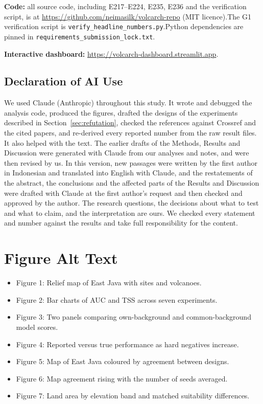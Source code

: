 \documentclass[12pt]{article}
\begin{document}
\textbf{Code:} all source code, including E217--E224, E235, E236 and the verification script, is at \url{https://github.com/neimasilk/volcarch-repo} (MIT licence).\newline The G1 verification script is \texttt{verify\_headline\_numbers.py}.\newline Python dependencies are pinned in \texttt{requirements\_submission\_lock.txt}.

\textbf{Interactive dashboard:} \url{https://volcarch-dashboard.streamlit.app}.

\subsection*{Declaration of AI Use}

We used Claude (Anthropic) throughout this study.
It wrote and debugged the analysis code, produced the figures, drafted the designs of the experiments described in Section~\ref{sec:refutation}, checked the references against Crossref and the cited papers, and re-derived every reported number from the raw result files.
It also helped with the text.
The earlier drafts of the Methods, Results and Discussion were generated with Claude from our analyses and notes, and were then revised by us.
In this version, new passages were written by the first author in Indonesian and translated into English with Claude, and the restatements of the abstract, the conclusions and the affected parts of the Results and Discussion were drafted with Claude at the first author's request and then checked and approved by the author.
The research questions, the decisions about what to test and what to claim, and the interpretation are ours.
We checked every statement and number against the results and take full responsibility for the content.



\section*{Figure Alt Text}
\begin{itemize}
  \item Figure 1: Relief map of East Java with sites and volcanoes.
  \item Figure 2: Bar charts of AUC and TSS across seven experiments.
  \item Figure 3: Two panels comparing own-background and common-background model scores.
  \item Figure 4: Reported versus true performance as hard negatives increase.
  \item Figure 5: Map of East Java coloured by agreement between designs.
  \item Figure 6: Map agreement rising with the number of seeds averaged.
  \item Figure 7: Land area by elevation band and matched suitability differences.
\end{itemize}
\end{document}
